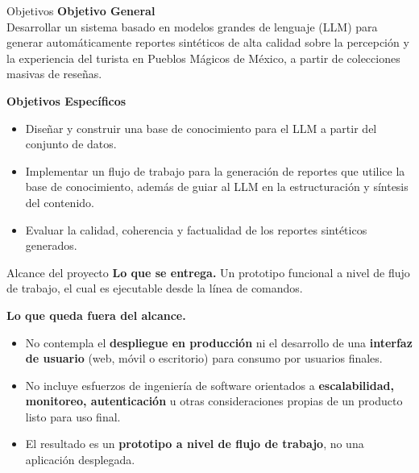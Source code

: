 \documentclass[10pt,aspectratio=169]{beamer}
\begin{document}
\begin{frame}{Objetivos}
	\textbf{Objetivo General}\\[4pt]
	Desarrollar un sistema basado en modelos grandes de lenguaje (LLM) para generar
	automáticamente reportes sintéticos de alta calidad sobre la percepción y la experiencia
	del turista en Pueblos Mágicos de México, a partir de colecciones masivas de reseñas.

	\bigskip
	\textbf{Objetivos Específicos}
	\begin{itemize}
		\item Diseñar y construir una base de conocimiento para el LLM a partir del conjunto
		      de datos.
		\item Implementar un flujo de trabajo para la generación de reportes que utilice la
		      base de conocimiento, además de guiar al LLM en la estructuración y síntesis
		      del contenido.
		\item Evaluar la calidad, coherencia y factualidad de los reportes sintéticos generados.
	\end{itemize}
\end{frame}

\begin{frame}{Alcance del proyecto}
	\textbf{Lo que se entrega.} Un prototipo funcional a nivel de
	flujo de trabajo, el cual es ejecutable desde la línea de comandos.

	\medskip
	\textbf{Lo que queda fuera del alcance.}
	\begin{itemize}\setlength\itemsep{3pt}
		\item No contempla el \textbf{despliegue en producción} ni el
		      desarrollo de una \textbf{interfaz de usuario} (web, móvil o
		      escritorio) para consumo por usuarios finales.
		\item No incluye esfuerzos de ingeniería de software orientados a
		      \textbf{escalabilidad, monitoreo, autenticación} u otras
		      consideraciones propias de un producto listo para uso final.
		\item El resultado es un \textbf{prototipo a nivel de flujo de trabajo},
		      no una aplicación desplegada.
	\end{itemize}
\end{frame}
\end{document}
